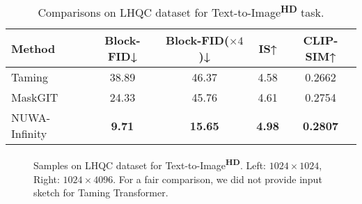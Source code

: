 \documentclass{article}
\begin{document}
\begin{table}[htbp]
\small
\centering
\setlength{\tabcolsep}{14pt}
\begin{tabular}{lcccc}
 \toprule
Method    & Block-FID↓    & Block-FID($\times 4$)↓ & IS↑           & CLIP-SIM↑       \\    
\midrule
Taming \cite{esserTamingTransformersHighResolution2021}    & 38.89         & 46.37          & 4.58          & 0.2662          \\
MaskGIT \cite{changMaskGITMaskedGenerative2022}   & 24.33         & 45.76          & 4.61          & 0.2754          \\
NUWA-Infinity & \textbf{9.71} & \textbf{15.65} & \textbf{4.98} & \textbf{0.2807} \\
 \bottomrule
\end{tabular}
\vspace{-2mm}
\caption{Comparisons on LHQC dataset for Text-to-Image\textsuperscript{\textbf{HD}} task.}
\label{tab:t2i_task}
\end{table}



\begin{figure}[h]
    \caption{Samples on LHQC dataset for Text-to-Image\textsuperscript{\textbf{HD}}. Left: $1024\times 1024$, Right: $1024\times 4096$. For a fair comparison, we did not provide input sketch for Taming Transformer.}
    \label{fig:vis_t2i}
    	\vspace{-3mm}
\end{figure}
\end{document}
